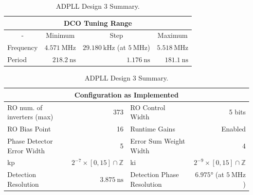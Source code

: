 \begin{table}[!h]%
	\begin{center}
		\begin{tabular}{|l|r|r|r|}
			\multicolumn{4}{c}{\ac{DCO} Tuning Range} \T\\
			\hline
			\multicolumn{1}{|c|}{-} & \multicolumn{1}{c|}{Minimum} & \multicolumn{1}{c|}{Step} & \multicolumn{1}{c|}{Maximum} \T\\
			\hline
			Frequency & $4.571~\si{\mega\hertz}$ & $29.180~\si{\kilo\hertz}$ (at $5~\si{\mega\hertz}$) & $5.518~\si{\mega\hertz}$ \T\\
			\hline
			Period & $218.2~\si{\nano\second}$ & $1.176~\si{\nano\second}$ & $181.1~\si{\nano\second}$ \T\\
			\hline
		\end{tabular}
		\begin{tabular}{|l|r|l|r|}
			\multicolumn{4}{c}{Configuration as Implemented} \T\\
			\hline
			\ac{RO} num. of inverters (max) & 373 & \ac{RO} Control Width & 5 bits \T\\
			\hline
			\ac{RO} Bias Point & 16 & Runtime Gains & Enabled \T\\
			\hline
			Phase Detector Error Width & 5 & Error Sum Weight Width & 4 \T\\
			\hline
			\acs{kp} & $2^{-7}\times[0,15]\cap\mathbb{Z}$ & \acs{ki} & $2^{-9}\times[0,15]\cap\mathbb{Z}$ \T\\
			\hline
			Detection Resolution & $3.875~\si{\nano\second}$ & Detection Phase Resolution & $6.975\si{\degree}$ (at $5~\si{\mega\hertz}$)\\
			\hline
		\end{tabular}
	\end{center}
	\caption[\ac{ADPLL} Design 3 Summary]{\ac{ADPLL} Design 3 Summary.}
	\label{table:adpll3}
\end{table}



